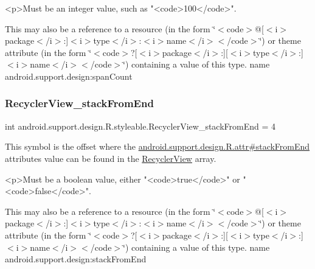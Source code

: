 \begin{DoxyVerb}      <p>Must be an integer value, such as "<code>100</code>".
\end{DoxyVerb}
 

This may also be a reference to a resource (in the form \char`\"{}$<$code$>$@\mbox{[}$<$i$>$package$<$/i$>$\+:\mbox{]}$<$i$>$type$<$/i$>$\+:$<$i$>$name$<$/i$>$$<$/code$>$\char`\"{}) or theme attribute (in the form \char`\"{}$<$code$>$?\mbox{[}$<$i$>$package$<$/i$>$\+:\mbox{]}\mbox{[}$<$i$>$type$<$/i$>$\+:\mbox{]}$<$i$>$name$<$/i$>$$<$/code$>$\char`\"{}) containing a value of this type.  name android.\+support.\+design\+:span\+Count \mbox{\label{classandroid_1_1support_1_1design_1_1R_1_1styleable_aa31f22249f518fec353aa52e96d2985d}} 
\subsubsection{\texorpdfstring{Recycler\+View\+\_\+stack\+From\+End}{RecyclerView\_stackFromEnd}}
{\footnotesize\ttfamily int android.\+support.\+design.\+R.\+styleable.\+Recycler\+View\+\_\+stack\+From\+End = 4\hspace{0.3cm}{\ttfamily [static]}}

This symbol is the offset where the \hyperlink{classandroid_1_1support_1_1design_1_1R_1_1attr_a1f9238824c3f4302159c28ee264ad333}{android.\+support.\+design.\+R.\+attr\#stack\+From\+End} attribute\textquotesingle{}s value can be found in the \hyperlink{classandroid_1_1support_1_1design_1_1R_1_1styleable_a1700d79470c52662f934bd53b1a05a14}{Recycler\+View} array.

\begin{DoxyVerb}      <p>Must be a boolean value, either "<code>true</code>" or "<code>false</code>".
\end{DoxyVerb}
 

This may also be a reference to a resource (in the form \char`\"{}$<$code$>$@\mbox{[}$<$i$>$package$<$/i$>$\+:\mbox{]}$<$i$>$type$<$/i$>$\+:$<$i$>$name$<$/i$>$$<$/code$>$\char`\"{}) or theme attribute (in the form \char`\"{}$<$code$>$?\mbox{[}$<$i$>$package$<$/i$>$\+:\mbox{]}\mbox{[}$<$i$>$type$<$/i$>$\+:\mbox{]}$<$i$>$name$<$/i$>$$<$/code$>$\char`\"{}) containing a value of this type.  name android.\+support.\+design\+:stack\+From\+End \mbox{\label{classandroid_1_1support_1_1design_1_1R_1_1styleable_a95b90e25d1cb72b4321bb1e78f92f75b}} 
